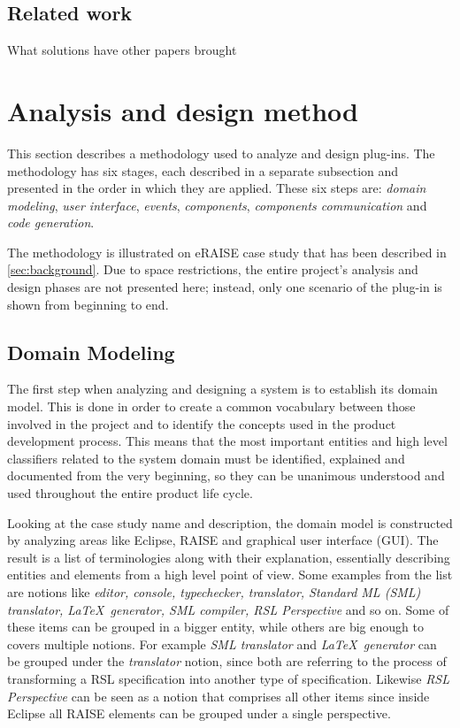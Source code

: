 \documentclass[conference]{IEEEtran}
\begin{document}
%
\subsection{Related work}
\label{sec:related-work}


What solutions have other papers brought

\section{Analysis and design method}
\label{sec:analys-design-meth}

This section describes a methodology used to analyze and design
plug-ins. The methodology has six stages, each described in a separate
subsection and presented in the order in which they are applied. These
six steps are: \emph{domain modeling}, \emph{user interface},
\emph{events}, \emph{components}, \emph{components communication} and
\emph{code generation}.

The methodology is illustrated on eRAISE case study that has been
described in \autoref{sec:background}. Due to space restrictions, the
entire project's analysis and design phases are not presented here;
instead, only one scenario of the plug-in is shown from beginning to
end.

%
\subsection{Domain Modeling}
\label{sec:domain-modeling}

The first step when analyzing and designing a system is to establish
its domain model. This is done in order to create a common vocabulary
between those involved in the project and to identify the concepts
used in the product development process. This means that the most
important entities and high level classifiers related to the system domain must
be identified, explained and documented from the very beginning, so they
can be unanimous understood and used throughout the entire product
life cycle.


Looking at the case study name and description, the domain model is
constructed by analyzing areas like Eclipse, RAISE and graphical user
interface (GUI). The result is a list of terminologies along with
their explanation, essentially describing entities and elements from a
high level point of view. Some examples from the list are notions like
\emph{editor, console, typechecker, translator, Standard ML
(SML)~\cite{SML} translator, \LaTeX\ generator, SML compiler, RSL
Perspective} and so on. Some of these items can be grouped in a bigger
entity, while others are big enough to covers multiple notions. For
example \emph{SML translator} and \emph{\LaTeX\ generator} can be
grouped under the \emph{translator} notion, since both are referring
to the process of transforming a RSL specification into another type
of specification. Likewise \emph{RSL Perspective} can be seen as a
notion that comprises all other items since inside Eclipse all RAISE
elements can be grouped under a single perspective.
\end{document}
